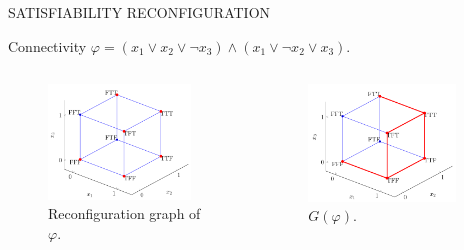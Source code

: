 \begin{frame}{SATISFIABILITY RECONFIGURATION}
    \begin{block}{Connectivity $\varphi = (x_1 \vee x_2 \vee \neg x_3) \wedge (x_1 \vee \neg x_2 \vee x_3)$. }
        \begin{columns}
            \begin{column}{0.5\textwidth}
                \begin{figure}
                \centering
                \includegraphics[width=0.9\textwidth]{img/sat_3.png}
                \caption{Reconfiguration graph of $\varphi$.}
                \label{fig:ps}
                \end{figure}
            \end{column}
            \pause
            \begin{column}{0.5\textwidth}
                \begin{figure}
                \centering
                \includegraphics[width=0.9\textwidth]{img/sat_4.png}
                \caption{$G(\varphi)$.\hfill \break}
                \label{fig:circle}
                \end{figure}
            \end{column}
        \end{columns}
    \end{block}
\end{frame}

